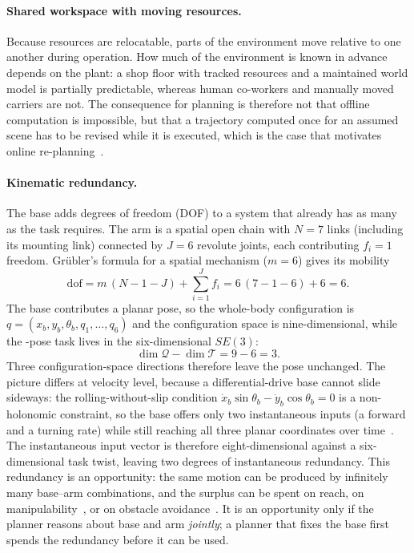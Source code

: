 \paragraph{Shared workspace with moving resources.}
Because resources are relocatable, parts of the environment move
relative to one another during operation. How much of the environment is
known in advance depends on the plant: a shop floor with tracked
resources and a maintained world model is partially predictable, whereas
human co-workers and manually moved carriers are not. The consequence
for planning is therefore not that offline computation is impossible,
but that a trajectory computed once for an assumed scene has to be
revised while it is executed, which is the case that motivates online
re-planning~\cite{Finean2023ContextAware}.

\paragraph{Kinematic redundancy.}
The base adds degrees of freedom (DOF) to a system that already has as
many as the task requires. The arm is a spatial open chain with
$N = 7$ links (including its mounting link) connected by $J = 6$
revolute joints, each contributing $f_i = 1$ freedom. Gr\"ubler's
formula for a spatial mechanism ($m = 6$) gives its
mobility~\cite{Lynch2017ModernRobotics}
\begin{equation}
  \label{eq:grubler}
  \mathrm{dof} = m\,(N - 1 - J) + \sum_{i=1}^{J} f_i
               = 6\,(7 - 1 - 6) + 6 = 6 .
\end{equation}
The base contributes a planar pose, so the whole-body configuration is
$q = (x_b, y_b, \theta_b, q_1, \dots, q_6)$ and the configuration space
is nine-dimensional, while the \ee{}-pose task lives in the
six-dimensional $SE(3)$:
\begin{equation}
  \label{eq:redundancy}
  \dim \mathcal{Q} - \dim \mathcal{T} = 9 - 6 = 3 .
\end{equation}
Three configuration-space directions therefore leave the \ee{} pose
unchanged. The picture differs at velocity level, because a
differential-drive base cannot slide sideways: the rolling-without-slip
condition $\dot{x}_b \sin\theta_b - \dot{y}_b \cos\theta_b = 0$ is a
non-holonomic constraint, so the base offers only two instantaneous
inputs (a forward and a turning rate) while still reaching all three
planar coordinates over time~\cite{Lynch2017ModernRobotics,%
Siciliano2009Robotics}. The instantaneous input vector is therefore
eight-dimensional against a six-dimensional task twist, leaving two
degrees of instantaneous redundancy. This redundancy is an opportunity:
the same \ee{} motion can be produced by infinitely many base--arm
combinations, and the surplus can be spent on reach, on
manipulability~\cite{Yoshikawa1985Manipulability}, or on obstacle
avoidance~\cite{Dietrich2015NullSpace}. It is an opportunity only if the
planner reasons about base and arm \emph{jointly}; a planner that fixes
the base first spends the redundancy before it can be used.

